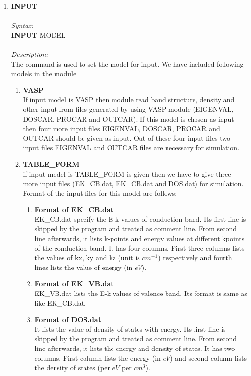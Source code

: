 \documentclass[12pt]{article}
\begin{document}
\begin{enumerate}
    \item \textbf{INPUT}   \\ \\
    \textit{Syntax:} \\
    \textbf{INPUT} MODEL \\ \\
    \textit{Description:} \\
    The command is used to set the model for input. We have included following models in the module \\
    \begin{enumerate}
        \item \textbf{VASP} \\
        If input model is VASP then module read band structure, density and other input from files generated by using VASP module (EIGENVAL, DOSCAR, PROCAR and OUTCAR). If this model is chosen as input then four more input files EIGENVAL, DOSCAR, PROCAR and OUTCAR should be given as input. Out of these four input files two input files  EIGENVAL and OUTCAR files are necessary for simulation. \\
        \item \textbf{TABLE\_FORM} \\
        if input model is TABLE\_FORM is given then we have to give three more input files (EK\_CB.dat, EK\_CB.dat and DOS.dat) for simulation. Format of the input files for this model are follows:-
        \begin{enumerate}
            \item \textbf{Format of EK\_CB.dat} \\
            EK\_CB.dat specify the E-k values of conduction band. Its first line is skipped by the program and treated as comment line. From second line afterwards, it lists k-points and energy values at different kpoints of the conduction band. It has four columns. First three columns lists the values of kx, ky and kz (unit is $cm^{-1}$) respectively and fourth lines lists the value of energy (in $eV$).  \\
            \item \textbf{Format of EK\_VB.dat} \\
            EK\_VB.dat lists the E-k values of valence band. Its format is same as like EK\_CB.dat. \\
            \item \textbf{Format of DOS.dat} \\
            It lists the value of density of states with energy. Its first line is skipped by the program and treated as comment line. From second line afterwards, it lists the energy and density of states. It has two columns. First column lists the energy (in $eV$) and second column lists the density of states (per $eV$ per $cm^3$). 
        \end{enumerate}
          

\end{enumerate}
\end{enumerate}
\end{document}
